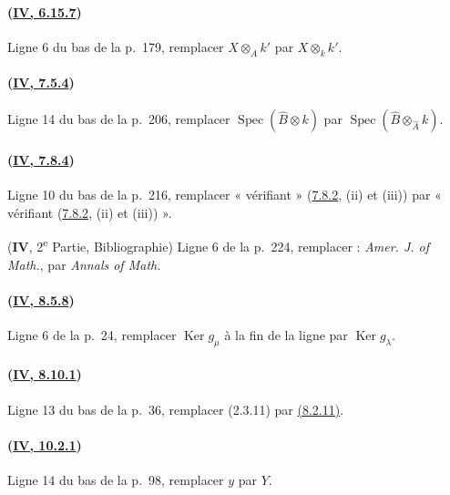 \paragraph{({\texorpdfstring{\protect\hyperref[canon-index.ega4.c04.prop.6-15-7]{IV, 6.15.7}}{IV, 6.15.7}})}
Ligne 6 du bas de la p.~179, remplacer $X\otimes_Ak'$ par
$X\otimes_kk'$.

\paragraph{({\texorpdfstring{\protect\hyperref[canon-index.ega4.c04.item.7-5-4]{IV, 7.5.4}}{IV, 7.5.4}})}
Ligne 14 du bas de la p.~206, remplacer
$\operatorname{Spec}(\widehat B\otimes k)$ par
$\operatorname{Spec}(\widehat B\otimes_{\widehat A}k)$.

\paragraph{({\texorpdfstring{\protect\hyperref[canon-index.ega4.c04.item.7-8-4]{IV, 7.8.4}}{IV, 7.8.4}})}
Ligne 10 du bas de la p.~216, remplacer « vérifiant »
({\hyperref[canon-index.ega4.c04.def.7-8-2]{7.8.2}}, (ii) et (iii)) par
« vérifiant ({\hyperref[canon-index.ega4.c04.def.7-8-2]{7.8.2}}, (ii) et (iii)) ».

(\textbf{IV}, 2\textsuperscript{e} Partie, Bibliographie)
Ligne 6 de la p.~224, remplacer : \emph{Amer. J. of Math.}, par
\emph{Annals of Math.}

\paragraph{({\texorpdfstring{\protect\hyperref[canon-index.ega4.c04.cor.8-5-8]{IV, 8.5.8}}{IV, 8.5.8}})}
Ligne 6 de la p.~24, remplacer $\operatorname{Ker}g_\mu$ à la fin de
la ligne par $\operatorname{Ker}g_\lambda$.

\paragraph{({\texorpdfstring{\protect\hyperref[canon-index.ega4.c04.prop.8-10-1]{IV, 8.10.1}}{IV, 8.10.1}})}
Ligne 13 du bas de la p.~36, remplacer (2.3.11) par
{\hyperref[canon-index.ega4.c04.cor.8-2-11]{(8.2.11)}}.

\paragraph{({\texorpdfstring{\protect\hyperref[canon-index.ega4.c04.prop.10-2-1]{IV, 10.2.1}}{IV, 10.2.1}})}
Ligne 14 du bas de la p.~98, remplacer $y$ par $Y$.

